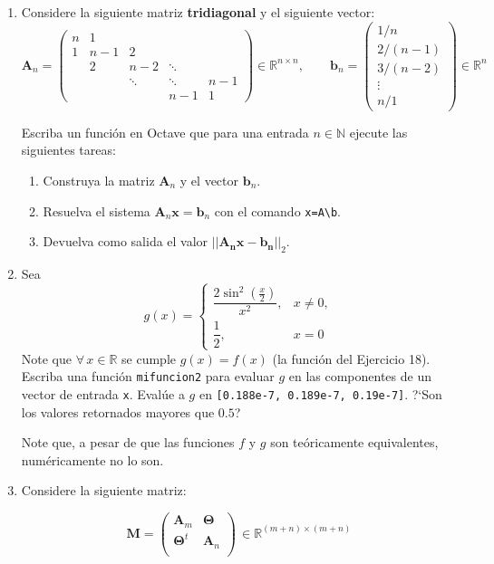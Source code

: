 \documentclass[letter,11pt]{article}
\newcommand{\N}{\mathbb{N}}
\newcommand\R{\mathbb{R}}
\newcommand\0{\mathbf{0}}
\newcommand{\octave}{{\sc Octave }}
\begin{document}
\begin{enumerate}
\item Considere la siguiente matriz \textbf{tridiagonal} y el siguiente vector:
$$\boldsymbol{A}_n=\left(\begin{array}{ccccc}
n&1&&&\\
1&n-1&2&&\\
&2&n-2&\ddots&\\
&&\ddots&\ddots&n-1\\
&&&n-1&1
\end{array}\right)\in\R^{n\times n},\qquad
\boldsymbol{b}_n=\left(\begin{array}{ccccc}
1/n\\
2/(n-1)\\
3/(n-2)\\
\vdots\\
n/1
\end{array}\right)\in\R^n$$

Escriba un funci\'on en  \octave que para una entrada $n\in \N$ ejecute las siguientes tareas:
\begin{enumerate}
\item Construya la matriz $\boldsymbol{A}_{n}$ y el vector $\boldsymbol{b}_{n}$.
\item Resuelva el sistema $\boldsymbol{A}_{n}\boldsymbol{x}=\boldsymbol{b}_{n}$ con el comando \verb"x=A\b".
\item Devuelva como salida el valor $||\boldsymbol{A_nx}-\boldsymbol{b_n}||_2$.
\end{enumerate}

\item Sea
\[
g(x) = \begin{cases}
\dfrac{2\sin^2\left(\frac x 2\right)}{x^2}, & x \ne 0,\\
\dfrac 1 2, & x = 0
\end{cases}                                	
\]
Note que $\forall\, x\in \R$ se cumple $g(x) = f(x)$ (la funci\'on del Ejercicio 18).
Escriba una funci\'on \Verb+mifuncion2+ para evaluar $g$ en las componentes
de un vector de entrada \verb+x+. 		
Eval\'ue a $g$ en \verb+[0.188e-7, 0.189e-7, 0.19e-7]+. ?`Son los valores retornados
mayores que $0.5$?

Note que, a pesar de que las funciones $f$ y $g$ son te\'oricamente equivalentes,
num\'ericamente no lo son.

\item Considere la siguiente matriz:

$$\boldsymbol{M}=\left(
\begin{array}{cc}
\boldsymbol{A}_{m} & \boldsymbol{\Theta} \\
\boldsymbol{\Theta}^{t} & \boldsymbol{A}_n \\
\end{array}
\right)\, \in \mathbb{R}^{(m+n) \times (m+n)}$$



\end{enumerate}
\end{document}
